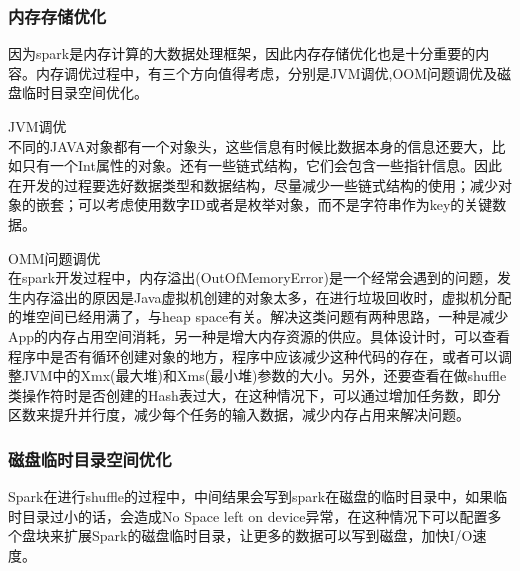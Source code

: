 \subsubsection{内存存储优化}
因为spark是内存计算的大数据处理框架，因此内存存储优化也是十分重要的内容。内存调优过程中，有三个方向值得考虑，分别是JVM调优,OOM问题调优及磁盘临时目录空间优化。
\begin{compactenum}
\item JVM调优\\不同的JAVA对象都有一个对象头，这些信息有时候比数据本身的信息还要大，比如只有一个Int属性的对象。还有一些链式结构，它们会包含一些指针信息。因此在开发的过程要选好数据类型和数据结构，尽量减少一些链式结构的使用；减少对象的嵌套；可以考虑使用数字ID或者是枚举对象，而不是字符串作为key的关键数据。
\item OMM问题调优\\在spark开发过程中，内存溢出(OutOfMemoryError)是一个经常会遇到的问题，发生内存溢出的原因是Java虚拟机创建的对象太多，在进行垃圾回收时，虚拟机分配的堆空间已经用满了，与heap space有关。解决这类问题有两种思路，一种是减少App的内存占用空间消耗，另一种是增大内存资源的供应。具体设计时，可以查看程序中是否有循环创建对象的地方，程序中应该减少这种代码的存在，或者可以调整JVM中的Xmx(最大堆)和Xms(最小堆)参数的大小。另外，还要查看在做shuffle类操作符时是否创建的Hash表过大，在这种情况下，可以通过增加任务数，即分区数来提升并行度，减少每个任务的输入数据，减少内存占用来解决问题。
\end{compactenum}

\subsubsection{磁盘临时目录空间优化}
Spark在进行shuffle的过程中，中间结果会写到spark在磁盘的临时目录中，如果临时目录过小的话，会造成No Space left on device异常，在这种情况下可以配置多个盘块来扩展Spark的磁盘临时目录，让更多的数据可以写到磁盘，加快I/O速度。
